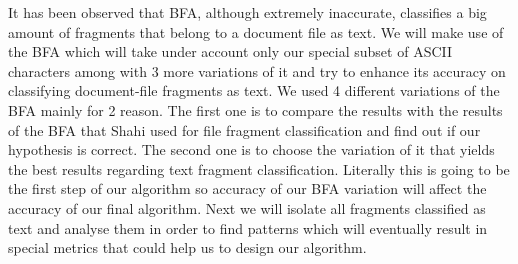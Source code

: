  It has been observed that BFA, although extremely inaccurate, classifies a big amount of fragments that belong to a document file as text. We will make use of the BFA which will take under account only our special subset of ASCII characters among with 3 more variations of it and try to enhance its accuracy on classifying document-file fragments as text.  We used 4 different variations of the BFA mainly for 2 reason.  The first one is to compare the results with the results of the BFA that Shahi used for file fragment classification and find out if our hypothesis is correct. The second one is to choose the variation of it that yields the best results regarding text fragment classification. Literally this is going to be the first step of our algorithm so accuracy of our BFA variation will affect the accuracy of our final algorithm. Next we will isolate all fragments classified as text and analyse them in order to find patterns which will eventually result in special metrics that could help us to design our algorithm.
 


